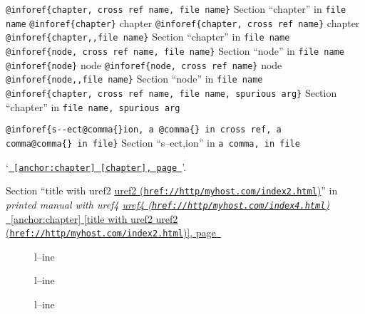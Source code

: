 \documentclass{book}
\renewcommand{\_}{\Texinfounderscore\discretionary{}{}{}}
\begin{document}
\texttt{@inforef\{chapter,\ cross ref name,\ file name\}} Section ``chapter'' in \texttt{file name}
\texttt{@inforef\{chapter\}} chapter
\texttt{@inforef\{chapter,\ cross ref name\}} chapter
\texttt{@inforef\{chapter{,}{,}file name\}} Section ``chapter'' in \texttt{file name}
\texttt{@inforef\{node,\ cross ref name,\ file name\}} Section ``node'' in \texttt{file name}
\texttt{@inforef\{node\}} node
\texttt{@inforef\{node,\ cross ref name\}} node
\texttt{@inforef\{node{,}{,}file name\}} Section ``node'' in \texttt{file name}
\texttt{@inforef\{chapter,\ cross ref name,\ file name,\ spurious arg\}} Section ``chapter'' in \texttt{file name,\ spurious arg}

\texttt{@inforef\{s{-}{-}ect@comma\{\}ion,\ a @comma\{\}\ in cross
ref,\ a comma@comma\{\}\ in file\}}
Section ``s--ect,ion'' in \texttt{a comma,\ in file}

`\texttt{\hyperref[anchor:chapter]{\chaptername~\ref*{anchor:chapter} [chapter], page~\pageref*{anchor:chapter}}}'.

Section ``title with uref2 \href{href://http/myhost.com/index2.html}{uref2 (\nolinkurl{href://http/myhost.com/index2.html})}'' in \textsl{printed manual with uref4 \href{href://http/myhost.com/index4.html}{uref4 (\nolinkurl{href://http/myhost.com/index4.html})}}
\hyperref[anchor:chapter]{\chaptername~\ref*{anchor:chapter} [title with uref2 \href{href://http/myhost.com/index2.html}{uref2 (\nolinkurl{href://http/myhost.com/index2.html})}], page~\pageref*{anchor:chapter}}

\begin{description}
\item[{\parbox[b]{\linewidth}{%
\textbf{a--strong}}}]
l--ine
\end{description}

\begin{description}
\item[{\parbox[b]{\linewidth}{%
a--asis\\
\index[cp]{a--asis@\texttt{a{-}{-}asis}}%
b
\index[cp]{b@\texttt{b}}%
}}]
l--ine
\end{description}

\begin{description}
\item[{\parbox[b]{\linewidth}{%
\emph{a}\\
\index[fn]{a@\texttt{a}}%
\index[cp]{index entry between item and itemx@index entry between item and itemx}%
\emph{b}
\index[fn]{b@\texttt{b}}%
}}]
l--ine
\end{description}
\end{document}
